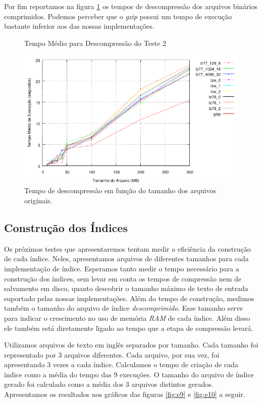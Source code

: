 \documentclass[]{article}
\newcommand{\figref}[1]{figura \ref{#1}}
\begin{document}
Por fim reportamos na \figref{fig:e8} os tempos de descompressão dos arquivos binários comprimidos. Podemos perceber que o \textit{gzip} possui um tempo de execução bastante inferior aos das nossas implementações. 


\begin{figure}
	{\centering Tempo Médio para Descompressão do Teste 2\par}
	\includegraphics{images/binario_descompressao}
\caption{Tempo de descompressão em função do tamanho dos arquivos originais.}
\label{fig:e8}
\end{figure}


\subsection{Construção dos Índices}

Os próximos testes que apresentaremos tentam medir a eficiência da construção de cada índice. Neles, apresentamos arquivos de diferentes tamanhos para cada implementação de índice. Esperamos tanto medir o tempo necessário para a construção dos índices, sem levar em conta os tempos de compressão nem de salvamento em disco, quanto descobrir o tamanho máximo de texto de entrada suportado pelas nossas implementações. Além do tempo de construção, medimos também o tamanho do arquivo de índice \textit{descomprimido}. Esse tamanho serve para indicar o crescimento no uso de memória \textit{RAM} de cada índice. Além disso ele também está diretamente ligado ao tempo que a etapa de compressão levará.

Utilizamos arquivos de texto em inglês separados por tamanho. Cada tamanho foi representado por 3 arquivos diferentes. Cada arquivo, por sua vez, foi apresentando 3 vezes a cada índice. Calculamos o tempo de criação de cada índice como a média do tempo das 9 execuções. O tamanho do arquivo de índice gerado foi calculado como a média dos 3 arquivos distintos gerados. Apresentamos os resultados nos gráficos das figuras \ref{fig:e9} e \ref{fig:e10} a seguir.
\end{document}
